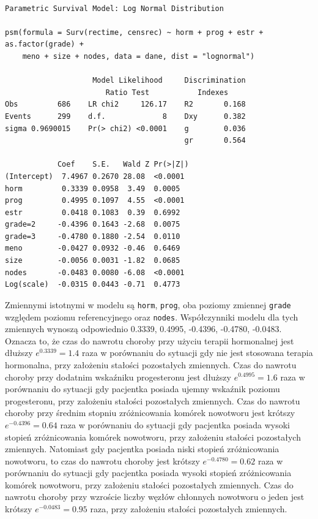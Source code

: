 \documentclass[]{article}
\begin{document}
\begin{verbatim}

Parametric Survival Model: Log Normal Distribution

psm(formula = Surv(rectime, censrec) ~ horm + prog + estr + as.factor(grade) + 
    meno + size + nodes, data = dane, dist = "lognormal")

                    Model Likelihood     Discrimination    
                       Ratio Test           Indexes        
Obs         686    LR chi2     126.17    R2       0.168    
Events      299    d.f.             8    Dxy      0.382    
sigma 0.9690015    Pr(> chi2) <0.0001    g        0.036    
                                         gr       0.564    

            Coef    S.E.   Wald Z Pr(>|Z|)
(Intercept)  7.4967 0.2670 28.08  <0.0001 
horm         0.3339 0.0958  3.49  0.0005  
prog         0.4995 0.1097  4.55  <0.0001 
estr         0.0418 0.1083  0.39  0.6992  
grade=2     -0.4396 0.1643 -2.68  0.0075  
grade=3     -0.4780 0.1880 -2.54  0.0110  
meno        -0.0427 0.0932 -0.46  0.6469  
size        -0.0056 0.0031 -1.82  0.0685  
nodes       -0.0483 0.0080 -6.08  <0.0001 
Log(scale)  -0.0315 0.0443 -0.71  0.4773  
\end{verbatim}

Zmiennymi istotnymi w modelu są \texttt{horm}, \texttt{prog}, oba
poziomy zmiennej \texttt{grade} względem poziomu referencyjnego oraz
\texttt{nodes}. Współczynniki modelu dla tych zmiennych wynoszą
odpowiednio 0.3339, 0.4995, -0.4396, -0.4780, -0.0483. Oznacza to, że
czas do nawrotu choroby przy użyciu terapii hormonalnej jest dłuższy
$e^{0.3339} = 1.4$ raza w porównaniu do sytuacji gdy nie jest stosowana
terapia hormonalna, przy założeniu stałości pozostałych zmiennych. Czas
do nawrotu choroby przy dodatnim wskaźniku progesteronu jest dłuższy
$e^{0.4995} = 1.6$ raza w porównaniu do sytuacji gdy pacjentka posiada
ujemny wskaźnik poziomu progesteronu, przy założeniu stałości
pozostałych zmiennych. Czas do nawrotu choroby przy średnim stopniu
zróżnicowania komórek nowotworu jest krótszy $e^{-0.4396} = 0.64$ raza w
porównaniu do sytuacji gdy pacjentka posiada wysoki stopień
zróżnicowania komórek nowotworu, przy założeniu stałości pozostałych
zmiennych. Natomiast gdy pacjentka posiada niski stopień zróżnicowania
nowotworu, to czas do nawrotu choroby jest krótszy $e^{-0.4780} = 0.62$
raza w porównaniu do sytuacji gdy pacjentka posiada wysoki stopień
zróżnicowania komórek nowotworu, przy założeniu stałości pozostałych
zmiennych. Czas do nawrotu choroby przy wzroście liczby węzłów chłonnych
 nowotworu o jeden jest krótszy $e^{-0.0483} = 0.95$
raza, przy założeniu stałości pozostałych zmiennych.
\end{document}
